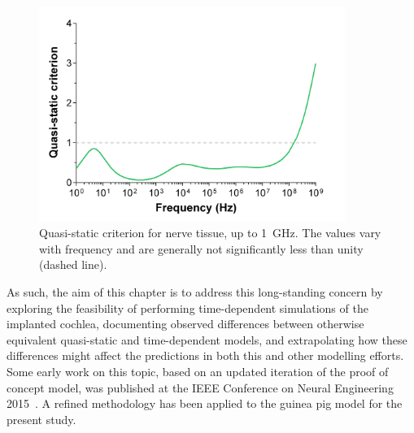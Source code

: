 \begin{figure}
	\centering
	\includegraphics[height=7cm]{Simulations/TimeDep/nerve_qsc}
	\caption[Quasi-static criterion for nerve tissue]{Quasi-static criterion for
	nerve tissue, up to 1~GHz. The values vary with frequency and are generally not
	significantly less than unity (dashed line).}
	\label{fig:nerve_qsc}
\end{figure} 




% 


As such, the aim of this chapter is to address this long-standing concern by
exploring the feasibility of performing time-dependent simulations of the
implanted cochlea, documenting observed differences between otherwise equivalent
quasi-static and time-dependent models, and extrapolating how these differences
might affect the predictions in both this and other modelling efforts. Some
early work on this topic, based on an updated iteration of the proof of concept
model, was published at the IEEE Conference on Neural Engineering
2015~\cite{inguva2015ner}. A refined methodology has been applied to the guinea
pig model for the present study.

